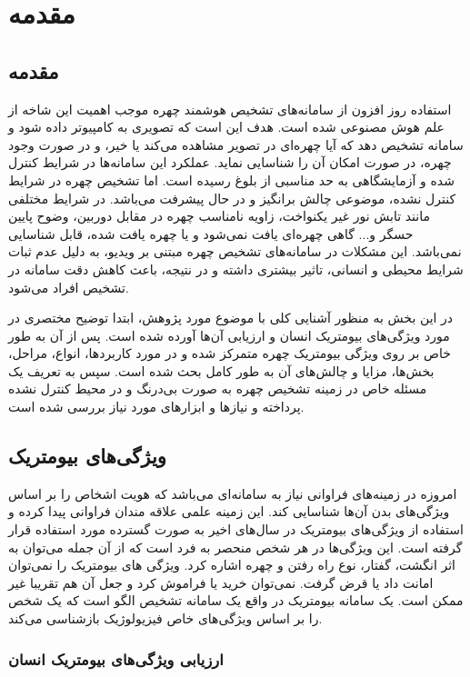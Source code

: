 \chapter{مقدمه}
\section{مقدمه}

استفاده روز افزون از سامانه‌های تشخیص هوشمند چهره موجب اهمیت این شاخه از علم هوش مصنوعی شده است. هدف این است که تصویری به کامپیوتر داده شود و سامانه تشخیص دهد که آیا چهره‌ای در تصویر مشاهده می‌کند یا خیر، و در صورت وجود چهره، در صورت امکان آن را شناسایی نماید. عملکرد این سامانه‌ها در شرایط کنترل شده و آزمایشگاهی به حد مناسبی از بلوغ رسیده است. اما تشخیص چهره در شرایط کنترل نشده، موضوعی چالش برانگیز و در حال پیشرفت می‌باشد. در شرایط مختلفی مانند تابش نور غیر یکنواخت، زاویه نامناسب چهره در مقابل دوربین، وضوح پایین حسگر و... گاهی چهره‌ای یافت نمی‌شود و یا چهره یافت شده، قابل شناسایی نمی‌باشد. این مشكلات در سامانه‌های تشخیص چهره مبتنی بر ویدیو، به دلیل عدم ثبات شرایط محیطی و انسانی، تاثیر بیشتری داشته و در نتیجه، باعث کاهش دقت سامانه در تشخیص افراد می‌شود.

\noindent
در این بخش به منظور آشنایی کلی با موضوع مورد پژوهش، ابتدا توضیح مختصری در مورد ویژگی‌های بیومتریک انسان و ارزیابی آن‌ها آورده شده است. پس از آن به طور خاص بر روی ویژگی بیومتریک چهره متمرکز شده و در مورد کاربردها، انواع، مراحل، بخش‌ها، مزایا و چالش‌های آن به طور کامل بحث شده است. سپس به تعریف یک مسئله خاص در زمینه تشخیص چهره به صورت بی‌درنگ و در محیط کنترل نشده پرداخته و نیاز‌ها و ابزارهای مورد نیاز بررسی شده است.

\section{ویژگی‌های بیومتریک}
امروزه در زمینه‌های فراوانی نیاز به سامانه‌ای می‌باشد که هویت اشخاص را بر اساس ویژگی‌های بدن آن‌ها شناسایی کند. این زمینه علمی علاقه مندان فراوانی پیدا کرده و استفاده از ویژگی‌های بیومتریک  در سال‌های اخیر به صورت گسترده مورد استفاده قرار گرفته است. این ویژگی‌ها در هر شخص منحصر به فرد است که از آن جمله می‌توان به اثر انگشت، گفتار، نوع راه رفتن و چهره اشاره کرد. ویژگی های بیومتریک را نمی‌توان امانت داد یا قرض گرفت. نمی‌توان خرید یا فراموش کرد و جعل آن هم تقریبا غیر ممکن است. یک سامانه بیومتریک در واقع یک سامانه تشخیص الگو است که یک شخص را بر اساس ویژگی‌های خاص فیزیولوژیک بازشناسی می‌کند. 

\subsection{ارزیابی ویژگی‌های بیومتریک انسان}

